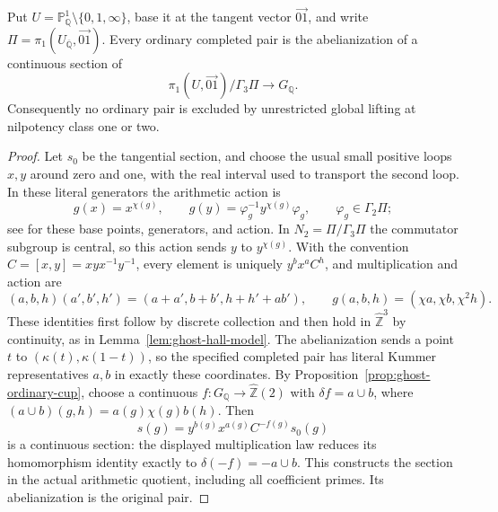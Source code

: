\begin{corollary}
\label{cor:ghost-class2-lift}
Put \(U=\mathbb P^1_{\mathbb Q}\setminus\{0,1,\infty\}\),
base it at the tangent vector \(\overrightarrow{01}\), and
write \(\Pi=\pi_1(U_{\overline{\mathbb Q}},\overrightarrow{01})\).
Every ordinary completed pair is the abelianization of a
continuous section of
\[
 \pi_1(U,\overrightarrow{01})/\Gamma_3\Pi
       \longrightarrow G_{\mathbb Q}.
\]
Consequently no ordinary pair is excluded by unrestricted
global lifting at nilpotency class one or two.
\end{corollary}
\begin{proof}
Let \(s_0\) be the tangential section, and choose the usual
small positive loops \(x,y\) around zero and one, with the
real interval used to transport the second loop. In these
literal generators the arithmetic action is
\[
 g(x)=x^{\chi(g)},\qquad
 g(y)=\varphi_g^{-1}y^{\chi(g)}\varphi_g,
             \qquad\varphi_g\in\Gamma_2\Pi;
\]
see \cite[(12.11)--(12.15)]{GhostWickelgren2012} for these
base points, generators, and action. In \(N_2=\Pi/\Gamma_3\Pi\)
the commutator subgroup is central, so this action sends
\(y\) to \(y^{\chi(g)}\). With the convention
\(C=[x,y]=xyx^{-1}y^{-1}\), every element is uniquely
\(y^b x^a C^h\), and multiplication and action are
\[
 (a,b,h)(a',b',h')=(a+a',b+b',h+h'+ab'),\qquad
 g(a,b,h)=(\chi a,\chi b,\chi^2h).
\]
These identities first follow by discrete collection and
then hold in \(\widehat{\mathbb Z}^3\) by continuity,
as in Lemma~\ref{lem:ghost-hall-model}. The abelianization
sends a point \(t\) to \((\kappa(t),\kappa(1-t))\),
so the specified completed pair has literal Kummer
representatives \(a,b\) in exactly these coordinates.
By Proposition~\ref{prop:ghost-ordinary-cup}, choose a
continuous \(f:G_{\mathbb Q}\to\widehat{\mathbb Z}(2)\)
with \(\delta f=a\cup b\), where
\((a\cup b)(g,h)=a(g)\chi(g)b(h)\). Then
\[
 s(g)=y^{b(g)}x^{a(g)}C^{-f(g)}s_0(g)
\]
is a continuous section: the displayed multiplication law
reduces its homomorphism identity exactly to
\(\delta(-f)=-a\cup b\). This constructs the section
in the actual arithmetic quotient, including all coefficient
primes. Its abelianization is the original pair.
\end{proof}
